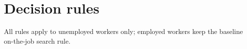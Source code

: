 \documentclass[11pt]{article}
\begin{document}

\section{Decision rules}

All rules apply to unemployed workers only; employed workers keep the baseline on-the-job search rule.
\end{document}
